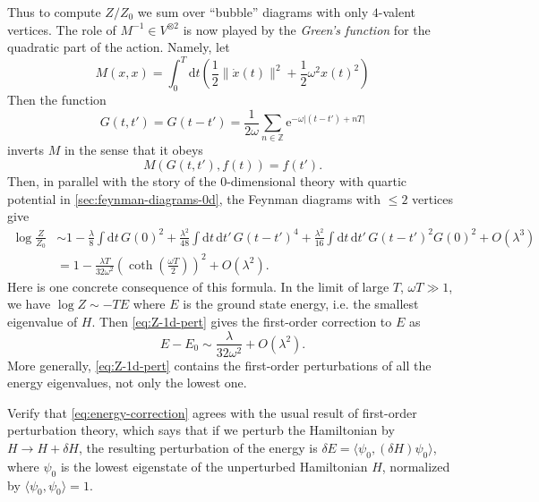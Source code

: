 \documentclass[12pt,letterpaper,reqno]{article}
\numberwithin{equation}{section}
\newcommand{\Z}{\ensuremath{\mathbb Z}}
\newcommand{\half}{\ensuremath{\frac{1}{2}}}
\newcommand{\e}{{\mathrm e}}
\newcommand{\de}{\mathrm{d}}
\newcommand{\abs}[1]{\lvert#1\rvert}
\newcommand{\norm}[1]{\lVert#1\rVert}
\newcommand{\IP}[1]{\langle#1\rangle}
\newcommand{\ti}[1]{\textit{#1}}
\begin{document}
Thus to compute $Z/Z_0$ we sum over ``bubble'' diagrams with only
$4$-valent vertices.
The role of $M^{-1} \in V^{\otimes 2}$ is now played by
the \ti{Green's function} for the quadratic part of the action.
Namely, let
\begin{equation}
 M(x,x) = \int_0^T \de t \left(\half \norm{\dot x(t)}^2 + \half \omega^2 x(t)^2\right)  
\end{equation}
Then the function
\begin{equation}
  G(t,t') = G(t-t') = \frac{1}{2 \omega} \sum_{n \in \Z} \e^{-\omega \abs{(t-t') + n T}}
\end{equation}
inverts $M$ in the sense that it obeys
\begin{equation}
  M\left(G(t,t'), f(t)\right) = f(t').
\end{equation}
Then, in parallel with the story of the $0$-dimensional theory
with quartic potential in \autoref{sec:feynman-diagrams-0d},
the Feynman diagrams with $\le 2$ vertices give
\begin{align} \label{eq:Z-1d-pert-first}
  \log \frac{Z}{Z_0} &\sim 1 - \frac{\lambda}{8} \int \de t \, G(0)^2 + \frac{\lambda^2}{48} \int \de t \, \de t' \, G(t-t')^4 + \frac{\lambda^2}{16} \int \de t \, \de t' \, G(t-t')^2 G(0)^2 + O(\lambda^3) \\
  &= 1 - \frac{\lambda T}{32 \omega^2} \left(\coth\left(\frac{\omega T}{2}\right)\right)^2 + O(\lambda^2). \label{eq:Z-1d-pert}
\end{align}
Here is one concrete consequence of this formula.
In the limit of large $T$, $\omega T \gg 1$, 
we have $\log Z \sim -T E$
where $E$ is the ground state energy, i.e. the smallest eigenvalue 
of $H$. Then
\eqref{eq:Z-1d-pert} gives the first-order correction
to $E$ as 
\begin{equation} \label{eq:energy-correction}
  E - E_0 \sim \frac{\lambda}{32 \omega^2} + O(\lambda^2).
\end{equation}
More generally, \eqref{eq:Z-1d-pert} contains the 
first-order perturbations
of all the energy eigenvalues, not only the lowest one.

\begin{exercise} Verify that \eqref{eq:energy-correction} 
agrees with the usual
result of first-order perturbation theory, which says that
if we perturb the Hamiltonian by $H \to H + \delta H$, the 
resulting perturbation of the energy is
$\delta E = \IP{\psi_0, (\delta H) \psi_0}$, where $\psi_0$ is the
lowest eigenstate of the unperturbed Hamiltonian $H$,
normalized by $\IP{\psi_0, \psi_0} = 1$.
\end{exercise}
\end{document}
